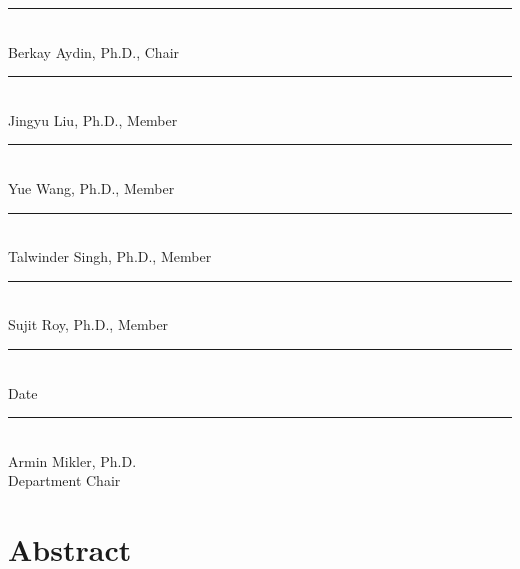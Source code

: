 \documentclass[12pt]{report}
\newcommand{\AdvisorName}{Berkay Aydin, Ph.D.}
\newcommand{\CommitteeMemberA}{Jingyu Liu, Ph.D.}
\newcommand{\CommitteeMemberB}{Yue Wang, Ph.D.}
\newcommand{\CommitteeMemberC}{Talwinder Singh, Ph.D.}
\newcommand{\CommitteeMemberD}{Sujit Roy, Ph.D.}
\newcommand{\DepartmentChair}{Armin Mikler, Ph.D.}
\begin{document}
\begin{titlepage}
    \rule{4.5in}{0.4pt}\\[-0.02in]
    \AdvisorName, Chair

    \vspace{0.13in}

    \rule{4.5in}{0.4pt}\\[-0.02in]
    \CommitteeMemberA, Member

    \vspace{0.13in}

    \rule{4.5in}{0.4pt}\\[-0.02in]
    \CommitteeMemberB, Member

    \vspace{0.13in}

    \rule{4.5in}{0.4pt}\\[-0.02in]
    \CommitteeMemberC, Member

    \vspace{0.13in}

    \rule{4.5in}{0.4pt}\\[-0.02in]
    \CommitteeMemberD, Member


    \vspace{0.18in}

    \rule{4.5in}{0.4pt}\\[-0.02in]
    Date


    \vspace{0.18in}

    \rule{4.5in}{0.4pt}\\[-0.02in]
    \DepartmentChair\\[-0.02in]
    Department Chair

\end{titlepage}


\chapter*{Abstract}
\end{document}
